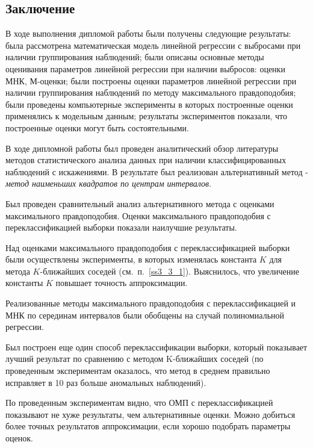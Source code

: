 \begin{center}
    \section*{Заключение}
\end{center}
{}
В ходе выполнения дипломой работы были получены следующие результаты: была рассмотрена математическая модель линейной регрессии с выбросами при наличии группирования наблюдений; были описаны основные методы оценивания параметров линейной регрессии при наличии выбросов: оценки МНК, М-оценки;
были построены оценки параметров линейной регрессии при наличии группирования наблюдений по методу максимального правдоподобия;
были проведены компьютерные эксперименты в которых построенные оценки применялись к модельным данным;
результаты экспериментов показали, что построенные оценки могут быть состоятельными.

В ходе дипломной работы был проведен аналитический обзор литературы методов статистического анализа данных при наличии классифицированных наблюдений с искажениями.
В результате был реализован альтернативный метод - \textit{метод наименьших квадратов по центрам интервалов}.

Был проведен сравнительный анализ альтернативного метода с оценками максимального правдоподобия. Оценки максимального правдоподобия с переклассификацией выборки показали наилучшие результаты. 

Над оценками максимального правдоподобия с переклассификацией выборки были осуществлены эксперименты, в которых изменялась константа $K$ для метода $K$-ближайших соседей (см.~п.~\ref{ss3_3_1}). Выяснилось, что увеличение константы $K$ повышает точность аппроксимации.

Реализованные методы максимального правдоподобия с переклассификацией и МНК по серединам интервалов  были обобщены на случай полиномиальной регрессии.

Был построен еще один способ переклассификации выборки, который показывает лучший результат по сравнению с методом K-ближайших соседей (по проведенным экспериментам оказалось, что метод в среднем правильно исправляет в 10 раз больше аномальных наблюдений).

По проведенным экспериментам видно, что ОМП с переклассификацией показывают не хуже результаты, чем альтернативные оценки.
Можно добиться более точных результатов аппроксимации, если хорошо подобрать параметры оценок.